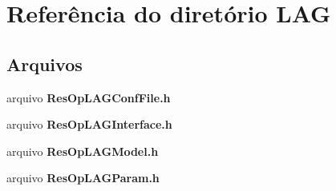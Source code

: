 \section{Referência do diretório L\+AG}
\label{dir_80507068b963d7e5c9397be811aaec2a}
\subsection*{Arquivos}
\begin{DoxyCompactItemize}
\item 
arquivo {\bf Res\+Op\+L\+A\+G\+Conf\+File.\+h}
\item 
arquivo {\bf Res\+Op\+L\+A\+G\+Interface.\+h}
\item 
arquivo {\bf Res\+Op\+L\+A\+G\+Model.\+h}
\item 
arquivo {\bf Res\+Op\+L\+A\+G\+Param.\+h}
\end{DoxyCompactItemize}
